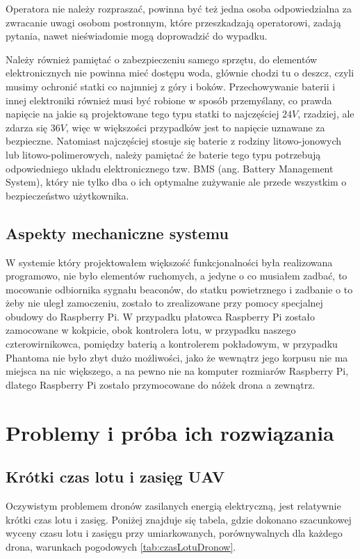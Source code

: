 Operatora nie należy rozpraszać, powinna być też jedna osoba odpowiedzialna za zwracanie uwagi osobom postronnym, które przeszkadzają operatorowi, zadają pytania, nawet nieświadomie mogą doprowadzić do wypadku. 

Należy również pamiętać o zabezpieczeniu samego sprzętu, do elementów elektronicznych nie powinna mieć dostępu woda, głównie chodzi tu o deszcz, czyli musimy ochronić statki co najmniej z góry i boków. Przechowywanie baterii i innej elektroniki również musi być robione w sposób przemyślany, co prawda napięcie na jakie są projektowane tego typu statki to najczęściej $24 V$, rzadziej, ale zdarza się $36 V$, więc w większości przypadków jest to napięcie uznawane za bezpieczne. Natomiast najczęściej stosuje się baterie z rodziny litowo-jonowych lub litowo-polimerowych, należy pamiętać że baterie tego typu potrzebują odpowiedniego układu elektronicznego tzw. BMS (ang. Battery Management System), który nie tylko dba o ich optymalne zużywanie ale przede wszystkim o bezpieczeństwo użytkownika.

\subsection{Aspekty mechaniczne systemu}

W systemie który projektowałem większość funkcjonalności była realizowana programowo, nie było elementów ruchomych, a jedyne o co musiałem zadbać, to mocowanie odbiornika sygnału beaconów, do statku powietrznego i zadbanie o to żeby nie uległ zamoczeniu, zostało to zrealizowane przy pomocy specjalnej obudowy do Raspberry Pi. W przypadku płatowca Raspberry Pi zostało zamocowane w kokpicie, obok kontrolera lotu, w przypadku naszego czterowirnikowca, pomiędzy baterią a kontrolerem pokładowym, w przypadku Phantoma nie było zbyt dużo możliwości, jako że wewnątrz jego korpusu nie ma miejsca na nic większego, a na pewno nie na komputer rozmiarów Raspberry Pi, dlatego Raspberry Pi zostało przymocowane do nóżek drona a zewnątrz.

\section{Problemy i próba ich rozwiązania}

\subsection{Krótki czas lotu i zasięg UAV}

Oczywistym problemem dronów zasilanych energią elektryczną, jest relatywnie krótki czas lotu i zasięg. Poniżej znajduje się tabela, gdzie dokonano szacunkowej wyceny czasu lotu i zasięgu przy umiarkowanych, porównywalnych dla każdego drona, warunkach pogodowych \ref{tab:czasLotuDronow}.

